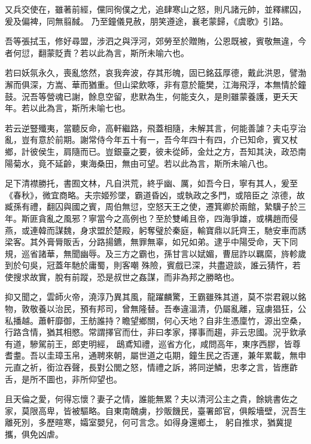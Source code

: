\begin{pinyinscope}
 又兵交使在，雖著前經，儻同徇僕之尤，追肆寒山之怒，則凡諸元帥，並釋縲囚，爰及偏裨，同無翦馘。
 乃至鐘儀見赦，朋笑遵途，襄老蒙歸，《虞歌》引路。



 吾等張拭玉，修好尋盟，涉泗之與浮河，郊勞至於贈賄，公恩既被，賓敬無違，今者何愆，翻蒙貶責？若以此為言，斯所未喻六也。



 若曰妖氛永久，喪亂悠然，哀我奔波，存其形魄，固已銘茲厚德，戴此洪恩，譬渤澥而俱深，方嵩、華而猶重。但山梁飲啄，非有意於籠樊，江海飛浮，本無情於鐘鼓。況吾等營魂已謝，餘息空留，悲默為生，何能支久，是則雖蒙養護，更夭天年。若以此為言，斯所未喻七也。



 若云逆豎殲夷，當聽反命，高軒繼路，飛蓋相隨，未解其言，何能善謔？夫屯亨治亂，豈有意於前期。謝常侍今年五十有一，吾今年四十有四，介已知命，賓又杖鄉，計彼侯生，肩隨而已。豈銀臺之要，彼未從師，金灶之方，吾知其決，政恐南陽菊水，竟不延齡，東海桑田，無由可望。若以此為言，斯所未喻八也。



 足下清襟勝托，書囿文林，凡自洪荒，終乎幽、厲，如吾今日，寧有其人，爰至《春秋》，微宜商略。夫宗姬殄墜，霸道昏凶，或執政之多門，或陪臣之
 涼德，故臧孫有禮，翻囚與國之賓，周伯無愆，空怒天王之使，遷箕卿於兩館，縶驥子於三年。斯匪貪亂之風邪？寧當今之高例也？至於雙崤且帝，四海爭雄，或構趙而侵燕，或連韓而謀魏，身求盟於楚殿，躬奪璧於秦庭，輸寶鼎以託齊王，馳安車而誘梁客。其外膏脣販舌，分路揚鑣，無罪無辜，如兄如弟。逮乎中陽受命，天下同規，巡省諸華，無聞幽辱。及三方之霸也，孫甘言以娬媚，曹屈詐以羈縻，旍軫歲到於句吳，冠蓋年馳於庸蜀，則客嘲
 殊險，賓戲已深，共盡遊談，誰云猜忤，若使搜求故實，脫有前蹤，恐是叔世之姦謀，而非為邦之勝略也。



 抑又聞之，雲師火帝，澆淳乃異其風，龍躍麟驚，王霸雖殊其道，莫不崇君親以銘物，敦敬養以治民，預有邦司，曾無隆替。吾奉違溫清，仍屬亂離，寇虜猖狂，公私播越。蕭軒靡御，王舫誰持？瞻望鄉關，何心天地？自非生憑廩竹，源出空桑，行路含情，猶其相愍。常謂擇官而仕，非曰孝家，擇事而趨，非云忠國。況乎欽承有道，驂駕前王，郎吏明經，
 鴟鳶知禮，巡省方化，咸問高年，東序西膠，皆尊耆耋。吾以圭璋玉帛，通聘來朝，屬世道之屯期，鐘生民之否運，兼年累載，無申元直之祈，銜泣吞聲，長對公閭之怒，情禮之訴，將同逆鱗，忠孝之言，皆應齚舌，是所不圖也，非所仰望也。



 且天倫之愛，何得忘懷？妻子之情，誰能無累？夫以清河公主之貴，餘姚書佐之家，莫限高卑，皆被驅略。自東南醜虜，抄販饑民，臺署郎官，俱餒墻壁，況吾生離死別，多歷暄寒，孀室嬰兒，何可言念。如得身還鄉土，
 躬自推求，猶冀提攜，俱免凶虐。




\end{pinyinscope}

